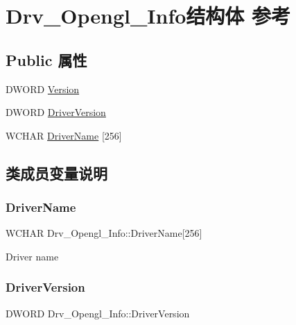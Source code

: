 \hypertarget{struct_drv___opengl___info}{}\section{Drv\+\_\+\+Opengl\+\_\+\+Info结构体 参考}
\label{struct_drv___opengl___info}
\subsection*{Public 属性}
\begin{DoxyCompactItemize}
\item 
D\+W\+O\+RD \hyperlink{struct_drv___opengl___info_a6b4d8da0a1b9008510910a884eaef7e2}{Version}
\item 
D\+W\+O\+RD \hyperlink{struct_drv___opengl___info_ae13fee6c294cc8204041b573d94914fb}{Driver\+Version}
\item 
W\+C\+H\+AR \hyperlink{struct_drv___opengl___info_a0927f612638a47f3948b369c1c623bee}{Driver\+Name} \mbox{[}256\mbox{]}
\end{DoxyCompactItemize}


\subsection{类成员变量说明}
\mbox{\label{struct_drv___opengl___info_a0927f612638a47f3948b369c1c623bee}} 
\subsubsection{\texorpdfstring{Driver\+Name}{DriverName}}
{\footnotesize\ttfamily W\+C\+H\+AR Drv\+\_\+\+Opengl\+\_\+\+Info\+::\+Driver\+Name\mbox{[}256\mbox{]}}

Driver name \mbox{\label{struct_drv___opengl___info_ae13fee6c294cc8204041b573d94914fb}} 
\subsubsection{\texorpdfstring{Driver\+Version}{DriverVersion}}
{\footnotesize\ttfamily D\+W\+O\+RD Drv\+\_\+\+Opengl\+\_\+\+Info\+::\+Driver\+Version}

